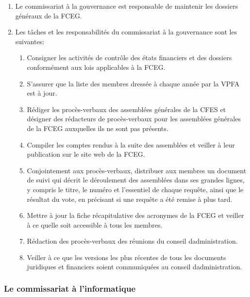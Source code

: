 \begin{enumerate}
 \item
  Le commissariat à la gouvernance est responsable de maintenir les dossiers généraux de la FCEG.
 \item
  Les tâches et les responsabilités du commissariat à la gouvernance sont les suivantes:

  \begin{enumerate}
   \item
    Consigner les activités de contrôle des états financiers et des dossiers conformément aux lois applicables à la FCEG.
   \item
    S’assurer que la liste des membres dressée à chaque année par la VPFA est à jour.
   \item
    Rédiger les procès-verbaux des assemblées générales de la CFES et désigner des rédacteurs de procès-verbaux pour les assemblées générales de la FCEG auxquelles ils ne sont pas présents.
   \item
    Compiler les comptes rendus à la suite des assemblées et veiller à leur publication sur le site web de la FCEG.
   \item
    Conjointement aux procès-verbaux, distribuer aux membres un document de suivi qui décrit le déroulement des assemblées dans ses grandes lignes, y compris le titre, le numéro et l’essentiel de chaque requête, ainsi que le résultat du vote, en précisant si une requête a été remise à plus tard.
   \item
    Mettre à jour la fiche récapitulative des acronymes de la FCEG et veiller à ce qu\textquotesingle elle soit accessible à tous les membres.
   \item
    Rédaction des procès-verbaux des réunions du conseil d\textquotesingle administration.
   \item
    Veiller à ce que les versions les plus récentes de tous les documents juridiques et financiers soient communiquées au conseil d\textquotesingle administration.
  \end{enumerate}
\end{enumerate}

\subsubsection{Le commissariat à l’informatique}
\label{le-commissariat-a-l-informatique}

